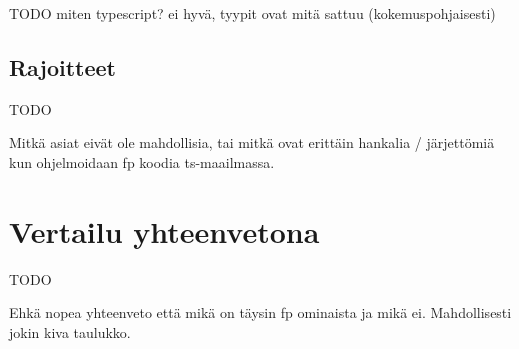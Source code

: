 TODO miten typescript? ei hyvä, tyypit ovat mitä sattuu (kokemuspohjaisesti)

\subsection{Rajoitteet}

TODO

Mitkä asiat eivät ole mahdollisia, tai mitkä ovat erittäin hankalia / järjettömiä kun ohjelmoidaan \gls{fp} koodia \gls{ts}-maailmassa.


\section{Vertailu yhteenvetona}

TODO

Ehkä nopea yhteenveto että mikä on täysin \gls{fp} ominaista ja mikä ei. Mahdollisesti jokin kiva taulukko.